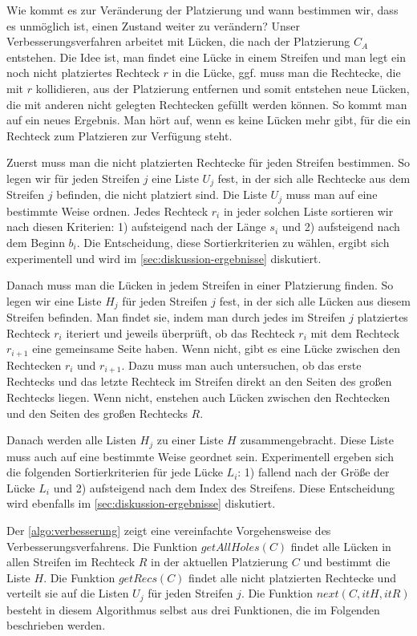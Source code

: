 Wie kommt es zur Veränderung der Platzierung und wann bestimmen wir,
dass es unmöglich ist, einen Zustand weiter zu verändern?
Unser Verbesserungsverfahren arbeitet mit Lücken, die 
nach der Platzierung $C_A$ entstehen.
Die Idee ist, man findet eine Lücke in einem Streifen 
und man legt ein noch nicht platziertes Rechteck $r$ in die Lücke,
ggf. muss man die Rechtecke,
die mit $r$ kollidieren, aus der Platzierung entfernen
und somit entstehen neue Lücken,
die mit anderen nicht gelegten Rechtecken gefüllt werden können.
So kommt man auf ein neues Ergebnis.
Man hört auf, wenn es keine Lücken mehr gibt, für die ein Rechteck zum Platzieren zur Verfügung steht.


Zuerst muss man die nicht platzierten Rechtecke für jeden Streifen bestimmen. 
So legen wir für jeden Streifen $j$ eine Liste $U_j$ fest, in der sich alle 
Rechtecke aus dem Streifen $j$ befinden, die nicht platziert sind.
Die Liste $U_j$ muss man auf eine bestimmte Weise ordnen.
Jedes Rechteck $r_i$ in jeder solchen Liste sortieren wir nach diesen Kriterien:
1) aufsteigend nach der Länge $s_i$ und 2) aufsteigend nach dem Beginn $b_i$.
Die Entscheidung, diese Sortierkriterien zu wählen, ergibt sich experimentell 
und wird im \cref{sec:diskussion-ergebnisse} diskutiert.


Danach muss man die Lücken in jedem Streifen in einer Platzierung finden.
So legen wir eine Liste $H_j$ für jeden Streifen $j$ fest, in der sich alle
Lücken aus diesem Streifen befinden. Man findet sie, indem
man durch jedes im Streifen $j$ platziertes Rechteck $r_i$ iteriert und jeweils überprüft,
ob das Rechteck $r_i$ mit dem Rechteck $r_{i+1}$ eine gemeinsame Seite haben. Wenn nicht, gibt es eine Lücke
zwischen den Rechtecken $r_i$ und $r_{i+1}$.
Dazu muss man auch untersuchen, ob das erste Rechtecks 
und das letzte Rechteck im Streifen direkt an den Seiten des großen Rechtecks liegen. 
Wenn nicht, enstehen auch Lücken zwischen den Rechtecken und den Seiten des großen Rechtecks $R$.  

Danach werden alle Listen $H_j$ zu einer Liste $H$ zusammengebracht.
Diese Liste muss auch auf eine bestimmte Weise geordnet sein. 
Experimentell ergeben sich die folgenden Sortierkriterien für jede Lücke $L_i$: 
1) fallend nach der Größe der Lücke $L_i$ und 2) aufsteigend nach dem
Index des Streifens. Diese Entscheidung wird ebenfalls im \cref{sec:diskussion-ergebnisse}
diskutiert.



Der \cref{algo:verbesserung} zeigt eine vereinfachte Vorgehensweise des Verbesserungsverfahrens.
Die Funktion $getAllHoles(C)$ findet alle Lücken in allen Streifen im Rechteck $R$ in der
aktuellen Platzierung $C$ und bestimmt die Liste $H$.
Die Funktion $getRecs(C)$ findet alle nicht platzierten Rechtecke und verteilt sie auf
die Listen $U_j$ für jeden Streifen $j$.
Die Funktion $next(C, itH, itR)$ besteht in diesem Algorithmus selbst aus drei Funktionen,
die im Folgenden beschrieben werden.

